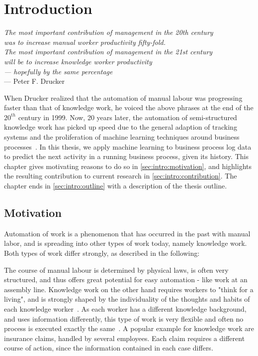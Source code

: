 \chapter{Introduction}\label{sec:intro}
\begin{flushright}{\slshape    
The most important contribution of management in the 20th century\\
was to increase manual worker productivity fifty-fold.\\
The most important contribution of management in the 21st century\\
will be to increase knowledge worker productivity\\
— hopefully by the same percentage} \\ \medskip
--- Peter F. Drucker~\cite{drucker1999}
\end{flushright}

\noindent When Drucker realized that the automation of manual labour was progressing faster than that of knowledge work, he voiced the above phrases at the end of the $20^{th}$ century in 1999. Now, 20 years later, the automation of semi-structured knowledge work has picked up speed due to the general adaption of tracking systems and the proliferation of machine learning techniques around business processes~\cite{boehmer2018probability, klinkmuller2018reliablemonitoring}.
In this thesis, we apply machine learning to business process log data to predict the next activity in a running business process, given its history. This chapter gives motivating reasons to do so in \autoref{sec:intro:motivation}, and highlights the resulting contribution to current research in \autoref{sec:intro:contribution}. The chapter ends in \autoref{sec:intro:outline} with a description of the thesis outline.

\section{Motivation} \label{sec:intro:motivation}
Automation of work is a phenomenon that has occurred in the past with manual labor, and is spreading into other types of work today, namely knowledge work. Both types of work differ strongly, as described in the following:

The course of manual labour is determined by physical laws, is often very structured, and thus offers great potential for easy automation - like work at an assembly line. Knowledge work on the other hand requires workers to "think for a living", and is strongly shaped by the individuality of the thoughts and habits of each knowledge worker~\cite{drucker1999}. As each worker has a different knowledge background, and uses information differently, this type of work is very flexible and often no process is executed exactly the same~\cite{hewelt2016}. A popular example for knowledge work are insurance claims, handled by several employees. Each claim requires a different course of action, since the information contained in each case differs.\\

